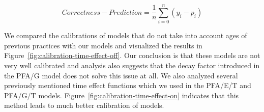 \begin{equation} \label{eq-callibration}
  \mathit{Correctness} - \mathit{Prediction} = \frac{1}{n} \sum_{i=0}^{n} (y_i - p_i)
\end{equation}

We compared the calibrations of models that do not take into account ages of previous practices with our models and visualized the results in Figure~\ref{fig:calibration-time-effect-off}. Our conclusion is that these models are not very well calibrated and analysis also suggests that the decay factor introduced in the PFA/G model does not solve this issue at all. We also analyzed several previously mentioned time effect functions which we used in the PFA/E/T and PFA/G/T models. Figure~\ref{fig:calibration-time-effect-on} indicates that this method leads to much better calibration of models.

